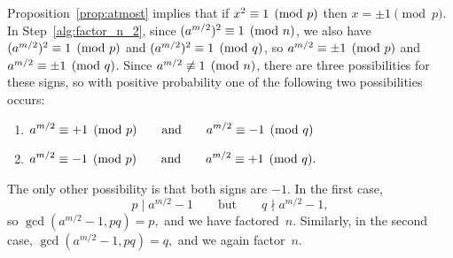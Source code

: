 Proposition~\ref{prop:atmost} implies that if $x^2\equiv 1\pmod{p}$ then
$x=\pm 1\pmod{p}$.  In Step~\ref{alg:factor_n_2}, since $(a^{m/2})^2
\equiv 1\pmod{n}$, we also have $(a^{m/2})^2 \equiv 1\pmod{p}$ and
$(a^{m/2})^2 \equiv 1\pmod{q}$, so $a^{m/2}\equiv \pm 1\pmod{p}$ and
$a^{m/2}\equiv \pm 1\pmod{q}$.  Since $a^{m/2}\not\equiv 1\pmod{n}$, there
are three possibilities for these signs, so with positive probability
one of the following two possibilities occurs:
\begin{enumerate}
\item
\quad$\displaystyle
a^{m/2}\equiv+1\pmod{p}\qquad\text{and}\qquad a^{m/2}\equiv -1\pmod{q}
$
\item
\quad$\displaystyle
a^{m/2}\equiv -1\pmod{p}\qquad\text{and}\qquad a^{m/2}\equiv
+1\pmod{q}.  $
\end{enumerate}
The only other possibility is that both signs are
$-1$.  In the first case, $$p\mid a^{m/2}-1 \qquad\text{but}\qquad
q\nmid a^{m/2}-1,$$
so $ \gcd(a^{m/2}-1,pq) = p, $ and we have
factored~$n$.  Similarly, in the second case, $ \gcd(a^{m/2}-1,pq) =
q, $ and we again factor~$n$.



